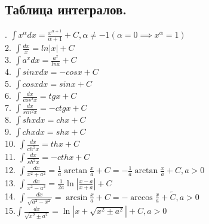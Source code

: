 \documentclass[../main.tex]{subfiles}
\begin{document}
\subsection{Таблица интегралов.} 
. $\displaystyle \int x^{\alpha}dx=\frac{x^{\alpha+1}}{\alpha+1}+C,\alpha\neq -1(\alpha=0\implies x^{\alpha}=1)$\\
2. $\displaystyle \int \frac{dx}{x}=ln|x|+C$\\
3. $\displaystyle \int a^{x}dx=\frac{a^{x}}{lna}+C$\\
4. $\displaystyle \int  sinxdx=-cosx+C$\\
5. $\displaystyle\int cosxdx=sinx+C$\\
6. $\displaystyle \int \frac{dx}{cos^{2}x}=tgx+C$\\
7. $\displaystyle \int \frac{dx}{sin^2x}=-ctgx+C$\\
8. $\displaystyle \int shxdx=chx+C$\\ 
9. $\displaystyle \int chxdx=shx+C$\\
10. $\displaystyle \int  \frac{dx}{ch^{2}x}=thx+C$\\
11. $\displaystyle \int  \frac{dx}{sh^{2}x}=-cthx+C$\\
12. $\displaystyle \int \frac{dx}{x^{2}+a^{2}}=\frac{1}{a} \arctan{\frac{x}{a}}+C=-\frac{1}{a}\arctan{\frac{x}{a}}+C,a>0$\\
13. $\displaystyle \int  \frac{dx}{x^2-a^2}=\frac{1}{2a}\ln{\left|\frac{x-a}{x+a}\right|}+C$\\
14. $\displaystyle\int \frac{dx}{\sqrt{a^{2}-x^{2}}}=\arcsin{\frac{x}{a}}+C=-\arccos{\frac{x}{a}}+\tilde{C},a>0$\\
15.$\displaystyle \int \frac{dx}{\sqrt{x^{2}\pm a^{2}}}=\ln{|x+\sqrt{x^{2}\pm a^{2}}|}+C,a>0$
\end{document}
